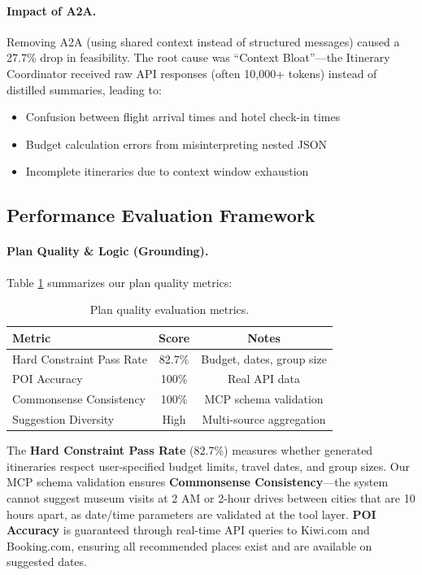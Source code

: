 \documentclass[conference]{IEEEtran}
\begin{document}
\paragraph{Impact of A2A.}
Removing A2A (using shared context instead of structured messages) caused a 27.7\% drop in feasibility. The root cause was ``Context Bloat''---the Itinerary Coordinator received raw API responses (often 10,000+ tokens) instead of distilled summaries, leading to:
\begin{itemize}
    \item Confusion between flight arrival times and hotel check-in times
    \item Budget calculation errors from misinterpreting nested JSON
    \item Incomplete itineraries due to context window exhaustion
\end{itemize}

\FloatBarrier
\subsection{Performance Evaluation Framework}

\paragraph{Plan Quality \& Logic (Grounding).}
Table \ref{tab:plan_quality} summarizes our plan quality metrics:

\begin{table}[h]
\centering
\small
\begin{tabular}{lcc}
\toprule
\textbf{Metric} & \textbf{Score} & \textbf{Notes} \\
\midrule
Hard Constraint Pass Rate & 82.7\% & Budget, dates, group size \\
POI Accuracy & 100\% & Real API data \\
Commonsense Consistency & 100\% & MCP schema validation \\
Suggestion Diversity & High & Multi-source aggregation \\
\bottomrule
\end{tabular}
\caption{Plan quality evaluation metrics.}
\label{tab:plan_quality}
\end{table}

The \textbf{Hard Constraint Pass Rate} (82.7\%) measures whether generated itineraries respect user-specified budget limits, travel dates, and group sizes. Our MCP schema validation ensures \textbf{Commonsense Consistency}---the system cannot suggest museum visits at 2 AM or 2-hour drives between cities that are 10 hours apart, as date/time parameters are validated at the tool layer. \textbf{POI Accuracy} is guaranteed through real-time API queries to Kiwi.com and Booking.com, ensuring all recommended places exist and are available on suggested dates.
\end{document}
